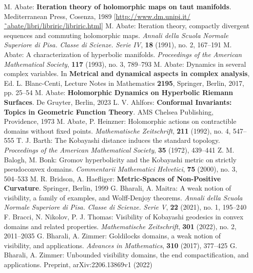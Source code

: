 \begin{thebibliography}{widest entry}
   M. Abate: \textbf{Iteration theory of holomorphic maps on taut manifolds}. Mediterranean Press, Cosenza, 1989 [\url{http://www.dm.unipi.it/˜abate/libri/libriric/libriric.html}]
   M. Abate: Iteration theory, compactly divergent sequences and commuting holomorphic maps. \textit{Annali della Scuola Normale Superiore di Pisa. Classe di Scienze. Serie IV}, \textbf{18} (1991), no. 2, 167--191
   M. Abate: A characterization of hyperbolic manifolds. \textit{Proceedings of the American Mathematical Society}, \textbf{117} (1993), no. 3, 789--793
   M. Abate: Dynamics in several complex variables. In \textbf{Metrical and dynamical aspects in complex analysis}, Ed. L. Blanc-Centi, Lecture Notes in Mathematics \textbf{2195}, Springer, Berlin, 2017, pp. 25--54
   M. Abate: \textbf{Holomorphic Dynamics on Hyperbolic Riemann Surfaces}. De Gruyter, Berlin, 2023
   L. V. Ahlfors: \textbf{Conformal Invariants: Topics in Geometric Function Theory}. AMS Chelsea Publishing, Providence, 1973
   M. Abate, P. Heinzner: Holomorphic actions on contractible domains without fixed points. \textit{Mathematische Zeitschrift}, \textbf{211} (1992), no. 4, 547--555
   T. J. Barth: The Kobayashi distance induces the standard topology. \textit{Proceedings of the American Mathematical Society}, \textbf{35} (1972), 439--441
   Z. M. Balogh, M. Bonk: Gromov hyperbolicity and the Kobayashi metric on strictly pseudoconvex domains. \textit{Commentarii Mathematici Helvetici}, \textbf{75} (2000), no. 3, 504--533
   M. R. Bridson, A. Haefliger: \textbf{Metric-Spaces of Non-Positive Curvature}. Springer, Berlin, 1999
   G. Bharali, A. Maitra: A weak notion of visibility, a family of examples, and Wolff-Denjoy theorems. \textit{Annali della Scuola Normale Superiore di Pisa. Classe di Scienze. Serie V}, \textbf{22} (2021), no. 1, 195--240
   F. Bracci, N. Nikolov, P. J. Thomas: Visibility of Kobayashi geodesics in convex domains and related properties. \textit{Mathematische Zeitschrift}, \textbf{301} (2022), no. 2, 2011--2035
   G. Bharali, A. Zimmer: Goldilocks domains, a weak notion of visibility, and applications. \textit{Advances in Mathematics}, \textbf{310} (2017), 377--425
   G. Bharali, A. Zimmer: Unbounded visibility domains, the end compactification, and applications. Preprint, arXiv:2206.13869v1 (2022)

\end{thebibliography}
